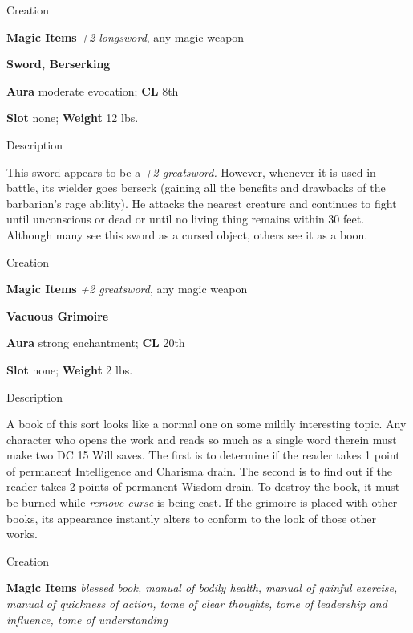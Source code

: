 Creation
				
\textbf{Magic Items}\textit{ +2 longsword}, any magic weapon
				
\textbf{Sword, Berserking}
				
\textbf{Aura} moderate evocation; \textbf{CL} 8th
				
\textbf{Slot} none; \textbf{Weight }12 lbs.
				
Description
				
This sword appears to be a \textit{+2 greatsword. }However, whenever it is used in battle, its wielder goes berserk (gaining all the benefits and drawbacks of the barbarian's rage ability). He attacks the nearest creature and continues to fight until unconscious or dead or until no living thing remains within 30 feet. Although many see this sword as a cursed object, others see it as a boon. 
				
Creation
				
\textbf{Magic Items}\textit{ +2 greatsword}, any magic weapon
				
\textbf{Vacuous Grimoire}
				
\textbf{Aura} strong enchantment; \textbf{CL} 20th
				
\textbf{Slot} none; \textbf{Weight }2 lbs.
				
Description
				
A book of this sort looks like a normal one on some mildly interesting topic. Any character who opens the work and reads so much as a single word therein must make two DC 15 Will saves. The first is to determine if the reader takes 1 point of permanent Intelligence and Charisma drain. The second is to find out if the reader takes 2 points of permanent Wisdom drain. To destroy the book, it must be burned while \textit{remove curse} is being cast. If the grimoire is placed with other books, its appearance instantly alters to conform to the look of those other works. 
				
Creation
				
\textbf{Magic Items}\textit{ blessed book, manual of bodily health, manual of gainful exercise, manual of quickness of action, tome of clear thoughts, tome of leadership and influence, tome of understanding}
        	
